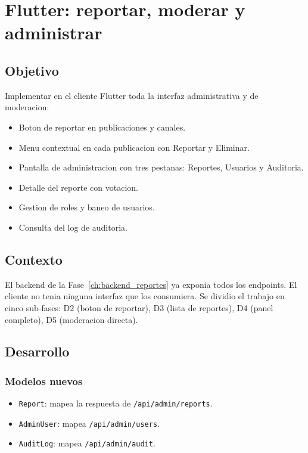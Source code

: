 \chapter{Flutter: reportar, moderar y administrar}
\label{ch:flutter_admin}

\section{Objetivo}

Implementar en el cliente Flutter toda la interfaz administrativa y de moderacion:

\begin{itemize}[leftmargin=*]
  \item Boton de reportar en publicaciones y canales.
  \item Menu contextual en cada publicacion con Reportar y Eliminar.
  \item Pantalla de administracion con tres pestanas: Reportes, Usuarios y Auditoria.
  \item Detalle del reporte con votacion.
  \item Gestion de roles y baneo de usuarios.
  \item Consulta del log de auditoria.
\end{itemize}

\section{Contexto}

El backend de la Fase~\ref{ch:backend_reportes} ya exponia todos los endpoints. El cliente no tenia ninguna interfaz que los consumiera. Se dividio el trabajo en cinco sub-fases: D2 (boton de reportar), D3 (lista de reportes), D4 (panel completo), D5 (moderacion directa).

\section{Desarrollo}

\subsection{Modelos nuevos}

\begin{itemize}[leftmargin=*]
  \item \texttt{Report}: mapea la respuesta de \texttt{/api/admin/reports}.
  \item \texttt{AdminUser}: mapea \texttt{/api/admin/users}.
  \item \texttt{AuditLog}: mapea \texttt{/api/admin/audit}.
\end{itemize}


